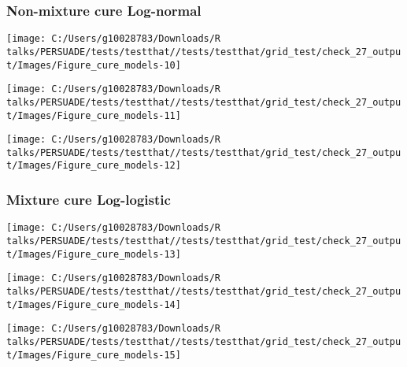 \documentclass[
]{article}
\begin{document}
\clearpage

\subsubsection{Non-mixture cure
Log-normal}\label{non-mixture-cure-log-normal}

\begin{flushleft}\texttt{[image: C:/Users/g10028783/Downloads/R talks/PERSUADE/tests/testthat//tests/testthat/grid\_test/check\_27\_output/Images/Figure\_cure\_models-10]} \end{flushleft}

\begin{flushleft}\texttt{[image: C:/Users/g10028783/Downloads/R talks/PERSUADE/tests/testthat//tests/testthat/grid\_test/check\_27\_output/Images/Figure\_cure\_models-11]} \end{flushleft}

\begin{flushleft}\texttt{[image: C:/Users/g10028783/Downloads/R talks/PERSUADE/tests/testthat//tests/testthat/grid\_test/check\_27\_output/Images/Figure\_cure\_models-12]} \end{flushleft}

\clearpage

\subsubsection{Mixture cure
Log-logistic}\label{mixture-cure-log-logistic}

\begin{flushleft}\texttt{[image: C:/Users/g10028783/Downloads/R talks/PERSUADE/tests/testthat//tests/testthat/grid\_test/check\_27\_output/Images/Figure\_cure\_models-13]} \end{flushleft}

\begin{flushleft}\texttt{[image: C:/Users/g10028783/Downloads/R talks/PERSUADE/tests/testthat//tests/testthat/grid\_test/check\_27\_output/Images/Figure\_cure\_models-14]} \end{flushleft}

\begin{flushleft}\texttt{[image: C:/Users/g10028783/Downloads/R talks/PERSUADE/tests/testthat//tests/testthat/grid\_test/check\_27\_output/Images/Figure\_cure\_models-15]} \end{flushleft}
\end{document}
